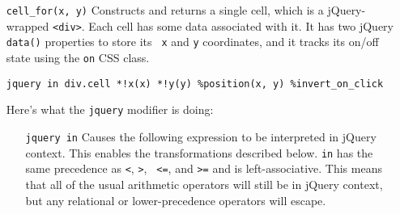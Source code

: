 \documentclass{report}
\begin{document}
\begin{enumerate}
\begin{enumerate}
\item[{\tt n[y]}]
  Construct an array of numbers {\tt [0, 1, 2, ..., y - 1]}.

\item[{\tt *y[...]}]
  Map over another block, this time interpreted as a regular Javascript expression. The {\tt y} immediately preceding the block causes the loop variables to be renamed to {\tt y},
  {\tt yi}, and {\tt yl} instead of the default {\tt x}, {\tt xi}, and {\tt xl}. The inner {\tt y} created for this block will shadow the one passed into \verb|cells_for()|.

  This map operation constructs a column of cells.

\item[{\tt -seq}]
  Interpret the outer map block in sequence context.

\item[{\tt cell\_for(x, y)}]
  Construct a single cell at the coordinates $(x, y)$. Because this is the result of mapping, the cell will be added to the column array.

\item[{\tt -seq}]
  This causes the entire preceding expression (in this case, everything back to the {\tt =}, which has lower precedence than the {\tt -} on the front of {\tt seq}) to be treated as
  a sequence comprehension. This is what causes {\tt *} to be interpreted as a map operation, {\tt n[]} to be interpreted as an array constructor, etc.

  {\tt seq} is a modifier just like {\tt jquery} and {\tt where[]}, so it could be written several different ways. I generally like to use {\tt -} because it's a medium-precedence
  operator that easily combines with things like {\tt -se-} and {\tt -re-}.
\end{enumerate}

\item[{\tt cell\_for(x, y)}]
  Constructs and returns a single cell, which is a jQuery-wrapped \verb|<div>|. Each cell has some data associated with it. It has two jQuery {\tt data()} properties to store its {\tt
  x} and {\tt y} coordinates, and it tracks its on/off state using the {\tt on} CSS class.

\begin{verbatim}
jquery in div.cell *!x(x) *!y(y) %position(x, y) %invert_on_click
\end{verbatim}

  Here's what the {\tt jquery} modifier is doing:

\begin{enumerate}
\item[{\tt jquery in}]
  Causes the following expression to be interpreted in jQuery context. This enables the transformations described below. {\tt in} has the same precedence as {\tt <}, {\tt >}, {\tt
  <=}, and {\tt >=} and is left-associative. This means that all of the usual arithmetic operators will still be in jQuery context, but any relational or lower-precedence operators
  will escape.


\end{enumerate}
\end{enumerate}
\end{document}
